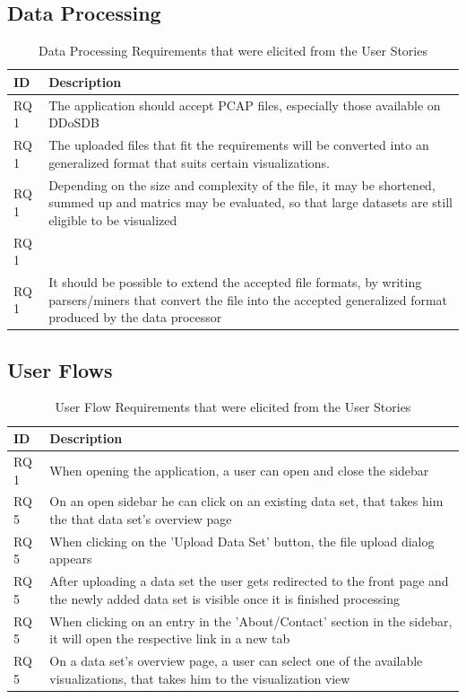 \subsection{Data Processing}
\begin{table}[]
\centering
\begin{tabular}{|p{1.1cm}|p{12cm}|}
\hline
\textbf{ID} & \textbf{Description} \\ \hline
RQ 1 &  The application should accept PCAP files, especially those available on DDoSDB\\ \hline
RQ 1 &  The uploaded files that fit the requirements will be converted into an generalized format that suits certain visualizations.\\ \hline
RQ 1 &  Depending on the size and complexity of the file, it may be shortened, summed up and matrics may be evaluated, so that large datasets are still eligible to be visualized\\ \hline
RQ 1 &  \\ \hline
RQ 1 &  It should be possible to extend the accepted file formats, by writing parsers/miners that convert the file into the accepted generalized format produced by the data processor\\ \hline

\end{tabular}
\caption{Data Processing Requirements that were elicited from the User Stories}
\label{table:2}
\end{table}

\subsection{User Flows}
\begin{table}[]
\centering
\begin{tabular}{|p{1.1cm}|p{12cm}|}
\hline
\textbf{ID} & \textbf{Description} \\ \hline
RQ 1 & When opening the application, a user can open and close the sidebar\\ \hline
RQ 5 & On an open sidebar he can click on an existing data set, that takes him the that data set's overview page\\ \hline
RQ 5 & When clicking on the 'Upload Data Set' button, the file upload dialog appears\\ \hline
RQ 5 & After uploading a data set the user gets redirected to the front page and the newly added data set is visible once it is finished processing\\ \hline
RQ 5 & When clicking on an entry in the 'About/Contact' section in the sidebar, it will open the respective link in a new tab\\ \hline
RQ 5 & On a data set's overview page, a user can select one of the available visualizations, that takes him to the visualization view\\ \hline

\end{tabular}
\caption{User Flow Requirements that were elicited from the User Stories}
\label{table:2}
\end{table}

